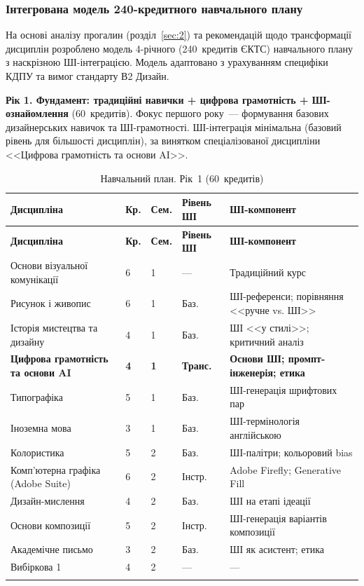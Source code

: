 \subsubsection{Інтегрована модель 240-кредитного навчального плану}\label{sssec:3.2.9}

На основі аналізу прогалин (розділ~\ref{sec:2}) та рекомендацій щодо трансформації дисциплін розроблено модель 4-річного (240~кредитів ЄКТС) навчального плану з наскрізною ШІ-інтеграцією. Модель адаптовано з урахуванням специфіки КДПУ та вимог стандарту В2 Дизайн.

\textbf{Рік 1. Фундамент: традиційні навички + цифрова грамотність + ШІ-ознайомлення} (60~кредитів). Фокус першого року~--- формування базових дизайнерських навичок та ШІ-грамотності. ШІ-інтеграція мінімальна (базовий рівень для більшості дисциплін), за винятком спеціалізованої дисципліни <<Цифрова грамотність та основи AI>>.

\begin{longtable}{@{}p{}p{}p{}p{}p{}@{}}
\caption{Навчальний план. Рік~1 (60~кредитів)}\label{tab:year1} \\
\hline
\textbf{Дисципліна} & \textbf{Кр.} & \textbf{Сем.} & \textbf{Рівень ШІ} & \textbf{ШІ-компонент} \\
\hline
\endfirsthead
\hline
\textbf{Дисципліна} & \textbf{Кр.} & \textbf{Сем.} & \textbf{Рівень ШІ} & \textbf{ШІ-компонент} \\
\hline
\endhead
Основи візуальної комунікації & 6 & 1 & --- & Традиційний курс \\
Рисунок і живопис & 6 & 1 & Баз. & ШІ-референси; порівняння <<ручне vs. ШІ>> \\
Історія мистецтва та дизайну & 4 & 1 & Баз. & ШІ <<у стилі>>; критичний аналіз \\
\textbf{Цифрова грамотність та основи AI} & \textbf{4} & \textbf{1} & \textbf{Транс.} & \textbf{Основи ШІ; промпт-інженерія; етика} \\
Типографіка & 5 & 1 & Баз. & ШІ-генерація шрифтових пар \\
Іноземна мова & 3 & 1 & Баз. & ШІ-термінологія англійською \\
\addlinespace
Колористика & 5 & 2 & Баз. & ШІ-палітри; кольоровий bias \\
Комп'ютерна графіка (Adobe Suite) & 6 & 2 & Інстр. & Adobe Firefly; Generative Fill \\
Дизайн-мислення & 4 & 2 & Баз. & ШІ на етапі ідеації \\
Основи композиції & 5 & 2 & Інстр. & ШІ-генерація варіантів композиції \\
Академічне письмо & 3 & 2 & Баз. & ШІ як асистент; етика \\
Вибіркова 1 & 4 & 2 & --- & --- \\
\addlinespace
\multicolumn{5}{@{}l}{\textit{Підсумок: 7~дисциплін~--- базовий рівень ШІ, 2~--- інструментальний, 1~--- трансформаційний}} \\
\hline
\end{longtable}

